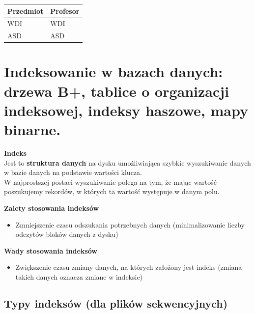 \documentclass[12pt]{article}
\begin{document}
\begin{enumerate}
        \begin{table}[H]
        \begin{tabular}{|l|l|}
        \hline
        Przedmiot & Profesor \\ \hline
        WDI       & WDI      \\ \hline
        ASD       & ASD      \\ \hline
        \end{tabular}
        \end{table}
        
        
        
    \end{enumerate}

    \section{Indeksowanie w bazach danych: drzewa B+, tablice o organizacji indeksowej, indeksy haszowe, mapy binarne.}
    
    \begin{definition}
    \textbf{Indeks}\\
    Jest to \textbf{struktura danych} na dysku umożliwiająca szybkie wyszukiwanie danych w bazie danych na podstawie wartości klucza.\\
    
    W najprostszej postaci wyszukiwanie polega na tym, że mając wartość poszukujemy rekordów, w których ta wartość występuje w danym polu.
    \end{definition}
    
    \textbf{Zalety stosowania indeksów}\\
    \begin{itemize}
        \item Zmniejszenie czasu odszukania potrzebnych danych (minimalizowanie liczby odczytów bloków danych z dysku)
    \end{itemize}
    
    \textbf{Wady stosowania indeksów}\\
    \begin{itemize}
        \item Zwiększenie czasu zmiany danych, na których założony jest indeks (zmiana takich danych oznacza zmiane w indeksie)
    \end{itemize}
    
    \subsection{Typy indeksów (dla plików sekwencyjnych)}
    
\end{document}
